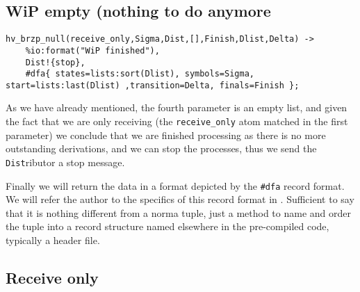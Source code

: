 \subsection{WiP empty (nothing to do anymore}
\label{sec:wip-empty}

\begin{lstlisting}[name=hvp2]
%The case when the WiP is empty
hv_brzp_null(receive_only,Sigma,Dist,[],Finish,Dlist,Delta) ->
	%io:format("WiP finished"), 
	Dist!{stop},
	#dfa{ states=lists:sort(Dlist), symbols=Sigma, start=lists:last(Dlist) ,transition=Delta, finals=Finish };
\end{lstlisting}
As we have already mentioned, the fourth parameter is an empty list,
and given the fact that we are only receiving (the
\texttt{receive\_only} atom matched in the first parameter) we conclude
that we are finished processing as there is no more outstanding
derivations, and we can stop the processes, thus we send the
\texttt{Dist}ributor a stop message.

Finally we will return the data in a format depicted by the
\texttt{\#dfa} record format. We will refer the author to the specifics
of this record format in \cite{joe:09}. Sufficient to say that it is
nothing different from a norma tuple, just a method to name and order
the tuple into a record structure named elsewhere in the pre-compiled
code, typically a header file.

\subsection{Receive only}
\label{sec:receive}

